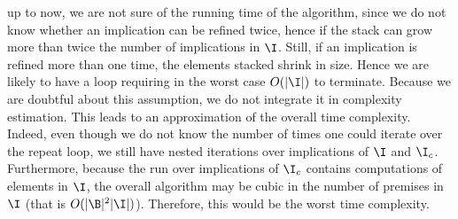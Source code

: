 \vspace{1.2em}

up to now, we are not sure of the running time of the algorithm, since we do
not know whether an implication can be refined twice, hence if the stack can
grow more than twice the number of implications in $\I$. Still, if an implication is refined more than one time, the elements stacked shrink in size. Hence we are likely to have a loop requiring in the worst case $O(|\I|)$ to terminate. Because we are doubtful about this assumption, we do not integrate it in complexity estimation. This leads to an approximation of the overall time complexity. Indeed, even though we do not know the number of times one could iterate over the repeat loop, we still have nested
iterations over implications of $\I$ and $\I_c$. Furthermore, because the run
over implications of $\I_c$ contains computations of elements in $\I$, the 
overall algorithm may be cubic in the number of premises in $\I$ (that is $O(|\B|^2|\I|)$). Therefore, this would be the worst time complexity.

\vspace{1.2em}

